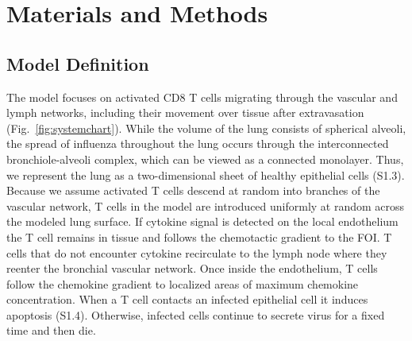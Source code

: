 \documentclass[10pt]{article}
\begin{document}


\section*{Materials and Methods}



\subsection*{Model Definition}


The model focuses on activated CD8 T cells migrating through the vascular and lymph networks, including their movement over tissue after extravasation (Fig.~\ref{fig:systemchart}).  {\color{dkblue}While the volume of the lung consists of spherical alveoli, the spread of influenza throughout the lung occurs through the interconnected bronchiole-alveoli complex, which can be viewed as a connected monolayer.  Thus, we represent the lung as a two-dimensional sheet of healthy epithelial cells (S1.3).}   Because we assume activated T cells descend at random into branches of the vascular network, T cells in the model are introduced uniformly at random across the modeled lung surface.  If cytokine signal is detected on the local endothelium the T cell remains in tissue and follows the chemotactic gradient to the FOI.  T cells that do not encounter cytokine recirculate to the lymph node where they reenter the bronchial vascular network.  Once inside the endothelium, T cells follow the chemokine gradient to localized areas of maximum chemokine concentration.  When a T cell contacts an infected epithelial cell it induces apoptosis (S1.4).  Otherwise, infected cells continue to secrete virus for a fixed time and then die.
\end{document}
